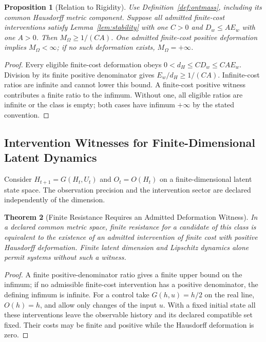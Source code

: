 \documentclass[11pt,a4paper]{article}
\theoremstyle{plain}
\newtheorem{theorem}{Theorem}[section]
\newtheorem{proposition}[theorem]{Proposition}
\theoremstyle{definition}
\theoremstyle{remark}
\begin{document}
\begin{proposition}[Relation to Rigidity]
Use Definition~\ref{def:ontmass}, including its common Hausdorff metric component.
Suppose all admitted finite-cost interventions satisfy Lemma~\ref{lem:stability}
with one $C>0$ and $D_w\leq A E_w$ with one $A>0$. Then
$M_\Omega\geq1/(CA)$. One admitted finite-cost positive deformation implies
$M_\Omega<\infty$; if no such deformation exists, $M_\Omega=+\infty$.
\end{proposition}
\begin{proof}
Every eligible finite-cost deformation obeys
$0<d_H\leq CD_w\leq CAE_w$. Division by its finite positive denominator
gives $E_w/d_H\geq1/(CA)$. Infinite-cost ratios are infinite and cannot lower
this bound. A finite-cost positive witness contributes a finite ratio to
the infimum. Without one, all eligible ratios are infinite or the class
is empty; both cases have infimum $+\infty$ by the stated convention.
\end{proof}

\subsection{Intervention Witnesses for Finite-Dimensional Latent Dynamics}

Consider $H_{t+1}=G(H_t,U_t)$ and $O_t=O(H_t)$ on a finite-dimensional latent state space. The observation precision and the intervention sector are declared independently of the dimension.

\begin{theorem}[Finite Resistance Requires an Admitted Deformation Witness]\label{thm:lml}
In a declared common metric space, finite resistance for a candidate of this class is equivalent to the existence of an admitted intervention of finite cost with positive Hausdorff deformation. Finite latent dimension and Lipschitz dynamics alone permit systems without such a witness.
\end{theorem}
\begin{proof}
A finite positive-denominator ratio gives a finite upper bound on the infimum; if no admissible finite-cost intervention has a positive denominator, the defining infimum is infinite. For a control take $G(h,u)=h/2$ on the real line, $O(h)=h$, and allow only changes of the input $u$. With a fixed initial state all these interventions leave the observable history and its declared compatible set fixed. Their costs may be finite and positive while the Hausdorff deformation is zero.
\end{proof}
\end{document}
